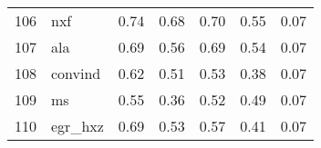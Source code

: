 \documentclass[12pt]{article}
\begin{document}
\begin{footnotesize}
\begin{longtable}{rl|c|c|c|c|c}
				106                  & nxf                         & 0.74                             & 0.68                                                                                          & 0.70                                                                                          & 0.55                                                                                          & 0.07                                                                                                   \\
				107                  & ala                         & 0.69                             & 0.56                                                                                          & 0.69                                                                                          & 0.54                                                                                          & 0.07                                                                                                   \\
				108                  & convind                     & 0.62                             & 0.51                                                                                          & 0.53                                                                                          & 0.38                                                                                          & 0.07                                                                                                   \\
				109                  & ms                          & 0.55                             & 0.36                                                                                          & 0.52                                                                                          & 0.49                                                                                          & 0.07                                                                                                   \\
				110                  & egr\_hxz                    & 0.69                             & 0.53                                                                                          & 0.57                                                                                          & 0.41                                                                                          & 0.07                                                                                                   \\

\end{longtable}
\end{footnotesize}
\end{document}
